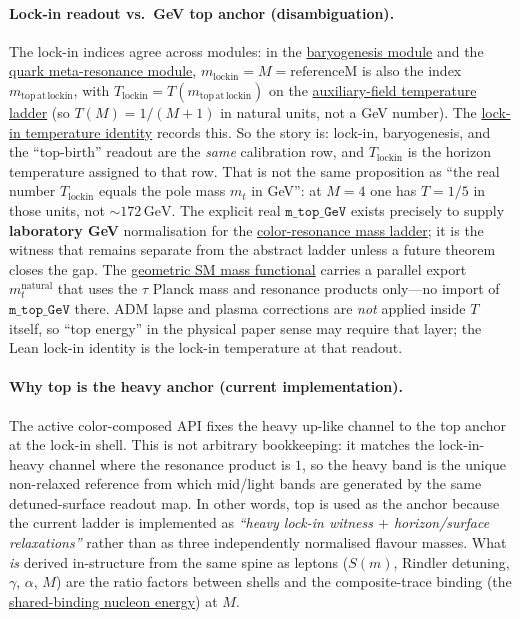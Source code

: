 \documentclass[11pt]{article}
\begin{document}
\paragraph{Lock-in readout vs.\ GeV top anchor (disambiguation).}
The lock-in indices agree across modules: in the
\hyperref[lean:baryogenesis]{baryogenesis module} and the
\hyperref[lean:quark-meta]{quark meta-resonance module},
$m_{\mathrm{lockin}}=M=\mathrm{referenceM}$ is also the index
$m_{\mathrm{top\,at\,lockin}}$, with
\(
  T_{\mathrm{lockin}} = T(m_{\mathrm{top\,at\,lockin}})
\)
on the
\hyperref[lean:auxiliary-T]{auxiliary-field temperature ladder}
(so $T(M)=1/(M+1)$ in natural units, not a GeV number). The
\hyperref[lean:t-lockin-id]{lock-in temperature identity}
records this. So the story is: lock-in, baryogenesis, and the
``top-birth'' readout are the \emph{same} calibration row, and
$T_{\mathrm{lockin}}$ is the horizon temperature assigned to
that row. That is not the same proposition as ``the real number
$T_{\mathrm{lockin}}$ equals the pole mass $m_t$ in GeV'': at
$M=4$ one has $T=1/5$ in those units, not $\sim 172\,\mathrm{GeV}$.
The explicit real $\mathtt{m\_top\_GeV}$ exists precisely to
supply \textbf{laboratory GeV} normalisation for the
\hyperref[lean:color-resonance]{color-resonance mass ladder};
it is the witness that remains separate from the abstract
ladder unless a future theorem closes the gap. The
\hyperref[lean:sm-mass]{geometric SM mass functional} carries a
parallel export $m_t^{\mathrm{natural}}$ that uses the $\tau$
Planck mass and resonance products only---no import of
$\mathtt{m\_top\_GeV}$ there. ADM lapse and plasma corrections
\cite{ettinger2026hqiv} are \emph{not} applied inside $T$
itself, so ``top energy'' in the physical paper sense may
require that layer; the Lean lock-in identity is the lock-in
temperature at that readout.

\paragraph{Why top is the heavy anchor (current implementation).}
The active color-composed API fixes the heavy up-like channel
to the top anchor at the lock-in shell. This is not arbitrary
bookkeeping: it matches the lock-in-heavy channel where the
resonance product is $1$, so the heavy band is the unique
non-relaxed reference from which mid/light bands are generated
by the same detuned-surface readout map. In other words, top is
used as the anchor because the current ladder is implemented as
\emph{``heavy lock-in witness $+$ horizon/surface relaxations''}
rather than as three independently normalised flavour masses.
What \emph{is} derived in-structure from the same spine as
leptons ($S(m)$, Rindler detuning, $\gamma$, $\alpha$, $M$) are
the ratio factors between shells and the composite-trace
binding (the
\hyperref[lean:shared-binding]{shared-binding nucleon energy})
at $M$.
\end{document}
